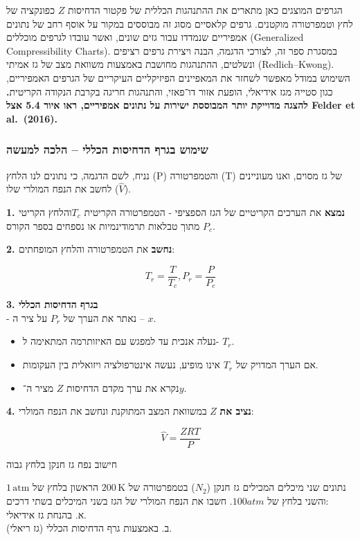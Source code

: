\documentclass[
  hebrew,
  letterpaper,
  DIV=11,
  numbers=noendperiod]{scrreprt}
\begin{document}
הגרפים המוצגים כאן מתארים את ההתנהגות הכללית של פקטור הדחיסות \(Z\)
כפונקציה של לחץ וטמפרטורה מוקטנים. גרפים קלאסיים מסוג זה מבוססים במקור
על אוסף רחב של נתונים אמפיריים שנמדדו עבור גזים שונים, ואשר עובדו לגרפים
מוכללים (Generalized Compressibility Charts). במסגרת ספר זה, לצורכי
הדגמה, הבנה ויצירת גרפים רציפים ונשלטים, ההתנהגות מחושבת באמצעות משוואת
מצב של גז אמיתי (Redlich--Kwong). השימוש במודל מאפשר לשחזר את המאפיינים
הפיזיקליים העיקריים של הגרפים האמפיריים, כגון סטייה מגז אידיאלי, הופעת
אזור דו־פאזי, והתנהגות חריגה בקרבת הנקודה הקריטית\textbf{. להצגה מדוייקת
יותר המבוססת ישירות על נתונים אמפיריים, ראו איור 5.4 אצל Felder et
al.~(2016).}

\subsubsection{שימוש בגרף הדחיסות הכללי -- הלכה
למעשה}\label{ux5e9ux5d9ux5deux5d5ux5e9-ux5d1ux5d2ux5e8ux5e3-ux5d4ux5d3ux5d7ux5d9ux5e1ux5d5ux5ea-ux5d4ux5dbux5dcux5dcux5d9-ux5d4ux5dcux5dbux5d4-ux5dcux5deux5e2ux5e9ux5d4}

נניח, לשם הדגמה, כי נתונים לנו הלחץ (P) והטמפרטורה (T) של גז מסוים, ואנו
מעוניינים לחשב את הנפח המולרי שלו (\(\widehat{V}\)).

\textbf{1. נמצא} את הערכים הקריטיים של הגז הספציפי - הטמפרטורה הקריטית
\(T_{c}\)והלחץ הקריטי \(P_{c}\) מתוך טבלאות תרמודינמיות או נספחים בספר
הקורס.

\textbf{2. נחשב} את הטמפרטורה והלחץ המופחתים:

\[T_{r} = \frac{T}{T_{c}},P_{r} = \frac{P}{P_{c}}\]

\textbf{3. בגרף הדחיסות הכללי}\\
- נאתר את הערך של \(P_{r}\) על ציר ה -- \(x\).

\begin{itemize}
\item
  נעלה אנכית עד למפגש עם האיזותרמה המתאימה ל- \(T_{r}\).
\item
  אם הערך המדויק של \(T_{r}\) אינו מופיע, נעשה אינטרפולציה ויזואלית בין
  העקומות.
\item
  נקרא את ערך מקדם הדחיסות \(Z\) מציר ה־\(y\).
\end{itemize}

\textbf{4. נציב את} \(Z\) במשוואת המצב המתוקנת ונחשב את הנפח המולרי:

\[\widehat{V} = \frac{ZRT}{P}\]

חישוב נפח גז חנקן בלחץ גבוה

נתונים שני מיכלים המכילים גז חנקן (\(N_{2}\)) בטמפרטורה של
\(200\,\text{K}\) הראשון בלחץ של \(1\,\text{atm}\) והשני בלחץ של
\(100atm\). חשבו את הנפח המולרי של הגז בשני המיכלים בשתי דרכים:\\
א. בהנחת גז אידיאלי.\\
ב. באמצעות גרף הדחיסות הכללי (גז ריאלי).
\end{document}

